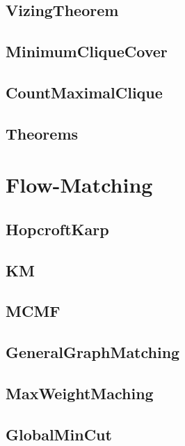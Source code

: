 	\subsection{VizingTheorem}
	
	\subsection{MinimumCliqueCover}
	
	\subsection{CountMaximalClique}
	
	\subsection{Theorems}
	
\section{Flow-Matching}
	\subsection{HopcroftKarp}
	
	\subsection{KM}
	
	\subsection{MCMF}
	
	\subsection{GeneralGraphMatching}
	
	\subsection{MaxWeightMaching}
	
	\subsection{GlobalMinCut}
	

